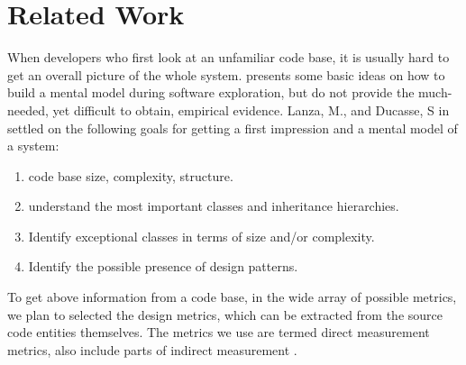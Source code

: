 \documentclass{sig-alternate}
\begin{document}
\section{Related Work}
When developers who first look at an unfamiliar code base, it is usually hard to get an overall picture of the whole system.
\cite{stasko1998software} presents some basic ideas on how to build a mental model during software exploration,
but do not provide the much-needed, yet difficult to obtain, empirical evidence.
Lanza, M., and Ducasse, S in \cite{lanza2003polymetric} settled on the following goals for getting a first impression and a mental model of a system:
\vspace{-2pt}
\begin{enumerate}
\item code base size, complexity, structure.
\vspace{-6pt}
\item understand the most important classes and inheritance hierarchies.
\vspace{-6pt}
\item Identify exceptional classes in terms of size and/or complexity.
\vspace{-6pt}
\item Identify the possible presence of design patterns.
\end{enumerate}
\vspace{-2pt}
To get above information from a code base, in the wide array of possible metrics,
we plan to selected the design metrics, which can be extracted from the source code entities themselves.
The metrics we use are termed direct measurement metrics, also include parts of indirect measurement \cite{storey1999cognitive}.
\end{document}
